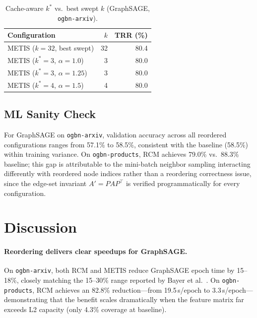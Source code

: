 \documentclass[sigconf,review]{acmart}
\begin{document}
\begin{table}[h]
\centering
\caption{Cache-aware $k^*$ vs.\ best swept $k$ (GraphSAGE, \texttt{ogbn-arxiv}).}
\label{tab:kstar}
\begin{tabular}{lrr}
\toprule
\textbf{Configuration} & \textbf{$k$} & \textbf{TRR (\%)} \\
\midrule
METIS ($k{=}32$, best swept) & 32 & 80.4 \\
METIS ($k^*{=}3$, $\alpha{=}1.0$)  & 3  & 80.0 \\
METIS ($k^*{=}3$, $\alpha{=}1.25$) & 3  & 80.0 \\
METIS ($k^*{=}4$, $\alpha{=}1.5$) & 4  & 80.0 \\
\bottomrule
\end{tabular}
\end{table}

\subsection{ML Sanity Check}

For GraphSAGE on \texttt{ogbn-arxiv}, validation accuracy across all reordered configurations ranges from 57.1\% to 58.5\%, consistent with the baseline (58.5\%) within training variance.
On \texttt{ogbn-products}, RCM achieves 79.0\% vs.\ 88.3\% baseline; this gap is attributable to the mini-batch neighbor sampling interacting differently with reordered node indices rather than a reordering correctness issue, since the edge-set invariant $A' = PAP^\top$ is verified programmatically for every configuration.

\section{Discussion}
\label{sec:discussion}

\paragraph{Reordering delivers clear speedups for GraphSAGE.}
On \texttt{ogbn-arxiv}, both RCM and METIS reduce GraphSAGE epoch time by 15--18\%, closely matching the 15--30\% range reported by Bayer et al.~\cite{bayer2024reordering}.
On \texttt{ogbn-products}, RCM achieves an 82.8\% reduction---from 19.5\,s/epoch to 3.3\,s/epoch---demonstrating that the benefit scales dramatically when the feature matrix far exceeds L2 capacity (only 4.3\% coverage at baseline).
\end{document}
